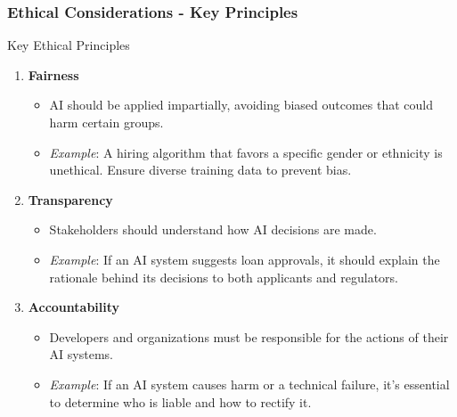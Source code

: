 \documentclass[aspectratio=169]{beamer}
\begin{document}
\begin{frame}[fragile]
    \frametitle{Ethical Considerations - Key Principles}
    \begin{block}{Key Ethical Principles}
        \begin{enumerate}
            \item \textbf{Fairness}
            \begin{itemize}
                \item AI should be applied impartially, avoiding biased outcomes that could harm certain groups.
                \item \textit{Example}: A hiring algorithm that favors a specific gender or ethnicity is unethical. Ensure diverse training data to prevent bias.
            \end{itemize}
            
            \item \textbf{Transparency}
            \begin{itemize}
                \item Stakeholders should understand how AI decisions are made.
                \item \textit{Example}: If an AI system suggests loan approvals, it should explain the rationale behind its decisions to both applicants and regulators.
            \end{itemize}
            
            \item \textbf{Accountability}
            \begin{itemize}
                \item Developers and organizations must be responsible for the actions of their AI systems.
                \item \textit{Example}: If an AI system causes harm or a technical failure, it’s essential to determine who is liable and how to rectify it.
            \end{itemize}
        \end{enumerate}
    \end{block}
\end{frame}
\end{document}
